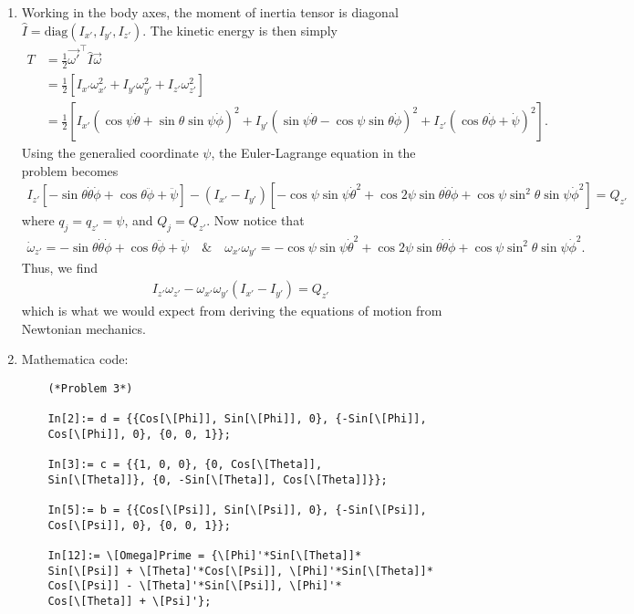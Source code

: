 \documentclass{article}
\theoremstyle{definition}
\newcommand{\f}[2]{\frac{#1}{#2}}
\newcommand{\lb}{\left[}
\newcommand{\rb}{\right]}
\begin{document}
\begin{enumerate}[label=(\alph*)]
	\item Working in the body axes, the moment of inertia tensor is diagonal $\hat I  = \text{diag}(I_{x'}, I_{y'} , I_{z'})$. The kinetic energy is then simply 
	\begin{align*}
	T &= \f{1}{2} \vec{\omega'}^\top \hat{I} \vec{\omega}\\
	&= \f{1}{2} \lb I_{x'} \omega_{x'}^2 + I_{y'}\omega_{y'}^2 + I_{z'}\omega_{z'}^2  \rb\\
	&= \f{1}{2}\lb I_{x'}(\cos\psi \dot\theta + \sin\theta \sin\psi \dot\phi)^2  + 
	I_{y'} (\sin\psi \dot\theta - \cos\psi \sin\theta \dot\phi)^2 + 
	I_{z'}(\cos\theta \dot\phi + \dot\psi)^2\rb.
	\end{align*}
	Using the generalied coordinate $\psi$, the Euler-Lagrange equation in the problem becomes 
	\begin{align*}
	I_{z'} \lb -\sin\theta \dot\theta \dot\phi+ \cos\theta \ddot\phi + \ddot\psi  \rb - (I_{x'} - I_{y'})
	\lb -\cos\psi \sin\psi \dot\theta^2+\cos 2\psi \sin\theta \dot\theta \dot \phi +\cos\psi \sin^2\theta\sin\psi \dot \phi^2 \rb 
	= Q_{z'}
	\end{align*}
	where $q_j = q_{z'} = \psi$, and $Q_j = Q_{z'}$. Now notice that 
	\begin{align*}
	\dot\omega_{z'} = -\sin\theta \dot\theta \dot\phi+ \cos\theta \ddot\phi + \ddot\psi\quad 
	\text{\&} 
	\quad
	\omega_{x'} \omega_{y'} = -\cos\psi \sin\psi \dot\theta^2+\cos 2\psi \sin\theta \dot\theta \dot \phi +\cos\psi \sin^2\theta\sin\psi \dot \phi^2.
	\end{align*}
	Thus, we find 
	\begin{align*}
	\boxed{I_{z'} \omega_{z'} - \omega_{x'} \omega_{y'} (I_{x'} - I_{y'}) = Q_{z'}}
	\end{align*}
	which is what we would expect from deriving the equations of motion from Newtonian mechanics. 
	
	
	\item Mathematica code:
	\begin{lstlisting}
	(*Problem 3*)
	
	In[2]:= d = {{Cos[\[Phi]], Sin[\[Phi]], 0}, {-Sin[\[Phi]], 
	Cos[\[Phi]], 0}, {0, 0, 1}};
	
	In[3]:= c = {{1, 0, 0}, {0, Cos[\[Theta]], 
	Sin[\[Theta]]}, {0, -Sin[\[Theta]], Cos[\[Theta]]}};
	
	In[5]:= b = {{Cos[\[Psi]], Sin[\[Psi]], 0}, {-Sin[\[Psi]], 
	Cos[\[Psi]], 0}, {0, 0, 1}};
	
	In[12]:= \[Omega]Prime = {\[Phi]'*Sin[\[Theta]]*
	Sin[\[Psi]] + \[Theta]'*Cos[\[Psi]], \[Phi]'*Sin[\[Theta]]*
	Cos[\[Psi]] - \[Theta]'*Sin[\[Psi]], \[Phi]'*
	Cos[\[Theta]] + \[Psi]'};
	

\end{lstlisting}
\end{enumerate}
\end{document}
